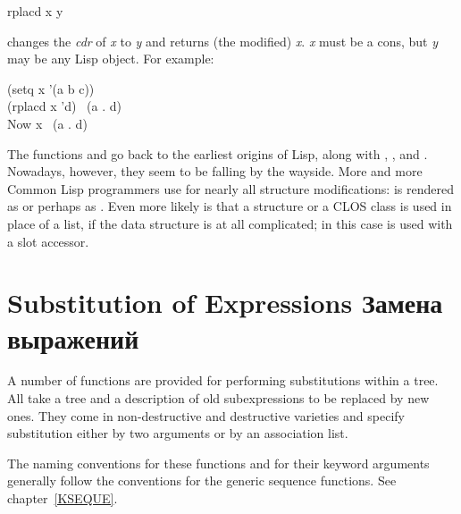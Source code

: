 \begin{defun}[Function]
rplacd x y

 changes the \emph{cdr} of \emph{x} to \emph{y} and returns
(the modified) \emph{x}.  \emph{x} must be a cons, but \emph{y} may be
any Lisp object.
For example:
\begin{lisp}
(setq x '(a b c)) \\
(rplacd x 'd) \EV\ (a . d) \\
\textrm{Now} x \EV\ (a . d)
\end{lisp}
\end{defun}

The functions  and  go back to the earliest
origins of Lisp, along with , , and .
Nowadays, however, they seem to be falling by the wayside.
More and more Common Lisp programmers use  for nearly
all structure modifications:  is rendered
as  or perhaps as .
Even more likely is that a  structure or a CLOS class
is used in place of a list, if the data structure is at all complicated;
in this case  is used with a slot accessor.

\newpage%

\section{Substitution of Expressions Замена выражений}

A number of functions are provided for performing substitutions
within a tree.  All take a tree and a description
of old subexpressions to be replaced by new ones.
They come in non-destructive and destructive varieties
and specify substitution either by two arguments or by an association list.

The naming conventions for these functions and for their keyword
arguments generally follow the conventions for the generic sequence
functions.  See chapter~\ref{KSEQUE}.

